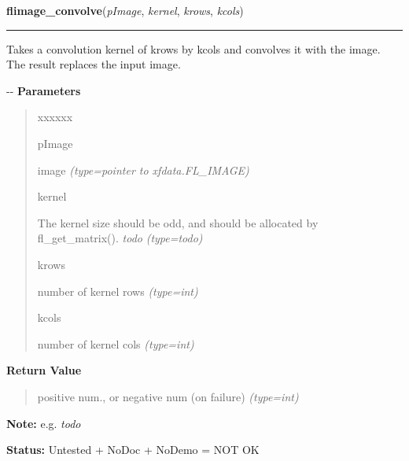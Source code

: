 \hspace{.8\funcindent}\begin{boxedminipage}{\funcwidth}

    \raggedright \textbf{flimage\_convolve}(\textit{pImage}, \textit{kernel}, \textit{krows}, \textit{kcols})

    \vspace{-1.5ex}

    \rule{\textwidth}{0.5\fboxrule}
\setlength{\parskip}{2ex}

Takes a convolution kernel of krows by kcols and convolves it with
the image. The result replaces the input image.

-{}-
\setlength{\parskip}{1ex}
      \textbf{Parameters}
      \vspace{-1ex}

      \begin{quote}
        \begin{Ventry}{xxxxxx}

          \item[pImage]


image
            {\it (type=pointer to xfdata.FL\_IMAGE)}

          \item[kernel]


The kernel size should be odd, and should be allocated by
fl\_get\_matrix(). \emph{todo}
            {\it (type=\emph{todo})}

          \item[krows]


number of kernel rows
            {\it (type=int)}

          \item[kcols]


number of kernel cols
            {\it (type=int)}

        \end{Ventry}

      \end{quote}

      \textbf{Return Value}
    \vspace{-1ex}

      \begin{quote}

positive num., or negative num (on failure)
      {\it (type=int)}

      \end{quote}

\textbf{Note:} 
e.g. \emph{todo}


\textbf{Status:} 
Untested + NoDoc + NoDemo = NOT OK


    \end{boxedminipage}

